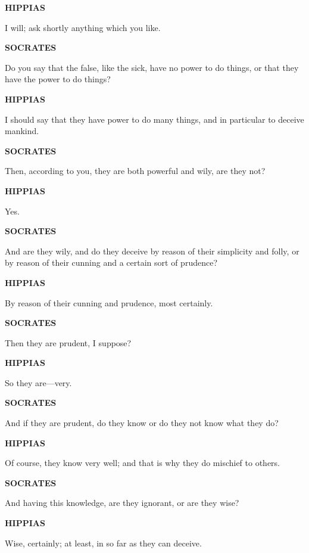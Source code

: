 \documentclass[11pt,letter]{article}
\begin{document}
\par \textbf{HIPPIAS}
\par   I will; ask shortly anything which you like.

\par \textbf{SOCRATES}
\par   Do you say that the false, like the sick, have no power to do things, or that they have the power to do things?

\par \textbf{HIPPIAS}
\par   I should say that they have power to do many things, and in particular to deceive mankind.

\par \textbf{SOCRATES}
\par   Then, according to you, they are both powerful and wily, are they not?

\par \textbf{HIPPIAS}
\par   Yes.

\par \textbf{SOCRATES}
\par   And are they wily, and do they deceive by reason of their simplicity and folly, or by reason of their cunning and a certain sort of prudence?

\par \textbf{HIPPIAS}
\par   By reason of their cunning and prudence, most certainly.

\par \textbf{SOCRATES}
\par   Then they are prudent, I suppose?

\par \textbf{HIPPIAS}
\par   So they are—very.

\par \textbf{SOCRATES}
\par   And if they are prudent, do they know or do they not know what they do?

\par \textbf{HIPPIAS}
\par   Of course, they know very well; and that is why they do mischief to others.

\par \textbf{SOCRATES}
\par   And having this knowledge, are they ignorant, or are they wise?

\par \textbf{HIPPIAS}
\par   Wise, certainly; at least, in so far as they can deceive.
\end{document}
